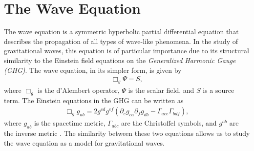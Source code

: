 \section{The Wave Equation}
\label{section:wave_equation}

The wave equation is a symmetric hyperbolic partial differential equation that describes the propagation of all types of wave-like phenomena. In the study of gravitational waves, this equation is of particular importance due to its structural similarity to the Einstein field equations on the \textit{Generalized Harmonic Gauge (GHG)}. The wave equation, in its simpler form, is given by
%
\begin{align}
    \Box_g \Psi = S,
    \label{eq:wave_equation_simple}
\end{align}
%
where $\Box_g$ is the d'Alembert operator, $\Psi$ is the scalar field, and $S$ is a source term. The Einstein equations in the GHG can be written as
%
\begin{align}
    \Box_g g_{ab} = 2 g^{cd} g^{ef} (\partial_e g_{ca} \partial_f g_{db} - \Gamma_{ace} \Gamma_{bdf}),
\end{align}
%
where $g_{ab}$ is the spacetime metric, $\Gamma_{abc}$ are the Christoffel symbols, and $g^{ab}$ are the inverse metric \cite{A_new_generalized_harmonic_evolution_system}. The similarity between these two equations allows us to study the wave equation as a model for gravitational waves.

